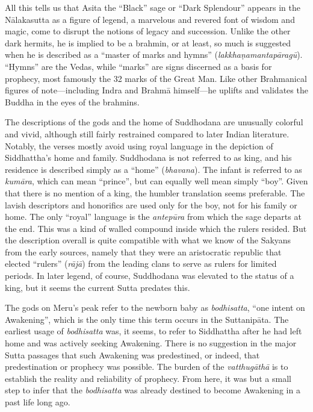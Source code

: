 \documentclass[12pt,openany]{book}%
\begin{document}
All this tells us that Asita the “Black” sage or “Dark Splendour” appears in the \textsanskrit{Nālakasutta} as a figure of legend, a marvelous and revered font of wisdom and magic, come to disrupt the notions of legacy and succession. Unlike the other dark hermits, he is implied to be a brahmin, or at least, so much is suggested when he is described as a “master of marks and hymns” (\textit{\textsanskrit{lakkhaṇamantapāragū}}). “Hymns” are the Vedas, while “marks” are signs discerned as a basis for prophecy, most famously the 32 marks of the Great Man. Like other Brahmanical figures of note—including Indra and \textsanskrit{Brahmā} himself—he uplifts and validates the Buddha in the eyes of the brahmins.

The descriptions of the gods and the home of Suddhodana are unusually colorful and vivid, although still fairly restrained compared to later Indian literature. Notably, the verses mostly avoid using royal language in the depiction of Siddhattha’s home and family. Suddhodana is not referred to as king, and his residence is described simply as a “home” (\textit{bhavana}). The infant is referred to as \textit{\textsanskrit{kumāra}}, which can mean “prince”, but can equally well mean simply “boy”. Given that there is no mention of a king, the humbler translation seems preferable. The lavish descriptors and honorifics are used only for the boy, not for his family or home. The only “royal” language is the \textit{\textsanskrit{antepūra}} from which the sage departs at the end. This was a kind of walled compound inside which the rulers resided. But the description overall is quite compatible with what we know of the Sakyans from the early sources, namely that they were an aristocratic republic that elected “rulers” (\textit{\textsanskrit{rājā}}) from the leading clans to serve as rulers for limited periods. In later legend, of course, Suddhodana was elevated to the status of a king, but it seems the current Sutta predates this.

The gods on Meru’s peak refer to the newborn baby as \textit{bodhisatta}, “one intent on Awakening”, which is the only time this term occurs in the \textsanskrit{Suttanipāta}. The earliest usage of \textit{bodhisatta} was, it seems, to refer to Siddhattha after he had left home and was actively seeking Awakening. There is no suggestion in the major Sutta passages that such Awakening was predestined, or indeed, that predestination or prophecy was possible. The burden of the \textit{\textsanskrit{vatthugāthā}} is to establish the reality and reliability of prophecy. From here, it was but a small step to infer that the \textit{bodhisatta} was already destined to become Awakening in a past life long ago.
\end{document}
